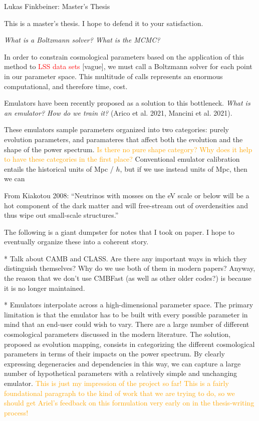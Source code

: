 \documentclass[11pt]{article}
\begin{document}
\fontsize{12}{15}

\begin{center}
Lukas Finkbeiner: Master's Thesis
\end{center}

This is a master's thesis. I hope to defend it to your satisfaction.

\textit{What is a Boltzmann solver? What is the MCMC?}

In order to constrain cosmological parameters based on the application of this method to \textcolor{red}{LSS data sets} [vague], we must call a Boltzmann solver for each point in our parameter space. This multitude of calls represents an enormous computational, and therefore time, cost.

Emulators have been recently proposed as a solution to this bottleneck. \textit{What is an emulator? How do we train it?} (Arico et al. 2021, Mancini et al. 2021).

These emulators sample parameters organized into two categories: purely evolution parameters, and paramateres that affect both the evolution and the shape of the power spectrum. \textcolor{orange}{Is there no pure shape category? Why does it help to have these categories in the first place?} Conventional emulator calibration entails the historical units of Mpc / $h$, but if we use instead units of Mpc, then we can 

From Kiakotou 2008: ``Neutrinos with mosses on the eV scale or below will be a hot component of the dark matter and will free-stream out of overdensities and thus wipe out small-scale structures.''

The following is a giant dumpster for notes that I took on paper. I hope to eventually organize these into a coherent story.

* Talk about CAMB and CLASS. Are there any important ways in which they distinguish themselves? Why do we use both of them in modern papers? Anyway, the reason that we don't use CMBFast (as well as other older codes?) is because it is no longer maintained.

* Emulators interpolate across a high-dimensional parameter space. The primary limitation is that the emulator has to be built with every possible parameter in mind that an end-user could wish to vary. There are a large number of different cosmological parameters discussed in the modern literature. The solution, proposed as evolution mapping, consists in categorizing the different cosmological parameters in terms of their impacts on the power spectrum. By clearly expressing degeneracies and dependencies in this way, we can capture a large number of hypothetical parameters with a relatively simple and unchanging emulator. \textcolor{orange}{This is just my impression of the project so far! This is a fairly foundational paragraph to the kind of work that we are trying to do, so we should get Ariel's feedback on this formulation very early on in the thesis-writing process!}
\end{document}
